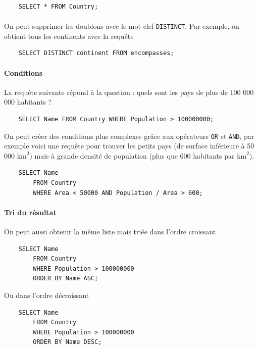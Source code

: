 \begin{verbatim}
    SELECT * FROM Country;
\end{verbatim}

\paragraph*{} On peut supprimer les doublons avec le mot clef \texttt{DISTINCT}. Par exemple, on obtient tous les continents avec la requête 

\begin{verbatim}
    SELECT DISTINCT continent FROM encompasses;
\end{verbatim}

\paragraph*{Conditions} La requête suivante répond à la question : quels sont les pays de plus de 100 000 000 habitants ?

\begin{verbatim}
    SELECT Name FROM Country WHERE Population > 100000000;
\end{verbatim}

On peut créer des conditions plus complexes grâce aux opérateurs \texttt{OR} et \texttt{AND}, par exemple voici une requête pour trouver les petits pays (de surface inférieure à 50 000 $ \textrm{km}^2 $) mais à grande densité de population (plus que 600 habitants par $ \textrm{km}^2 $).

\begin{verbatim}
    SELECT Name
        FROM Country
        WHERE Area < 50000 AND Population / Area > 600;
\end{verbatim}


\paragraph*{Tri du résultat} On peut aussi obtenir la même liste mais triée dans l'ordre croissant

\begin{verbatim}
    SELECT Name 
        FROM Country 
        WHERE Population > 100000000 
        ORDER BY Name ASC;
\end{verbatim}

Ou dans l'ordre décroissant

\begin{verbatim}
    SELECT Name 
        FROM Country 
        WHERE Population > 100000000 
        ORDER BY Name DESC;
\end{verbatim}

